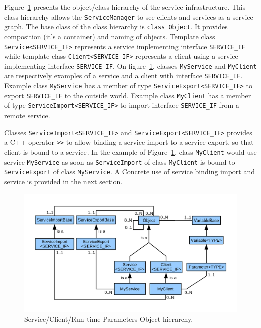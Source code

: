 Figure~\ref{fig:tms320c3x_object_hierarchy} presents the object/class hierarchy of the service infrastructure. This class hierarchy allows the \texttt{ServiceManager} to see clients and services as a service graph. The base class of the class hierarchy is \texttt{class Object}. It provides composition (it's a container) and naming of objects. Template class \texttt{Service<SERVICE\_IF>} represents a service implementing interface \texttt{SERVICE\_IF} while template class \texttt{Client<SERVICE\_IF>} represents a client using a service implementing interface \texttt{SERVICE\_IF}. On figure~\ref{fig:tms320c3x_object_hierarchy}, classes \texttt{MyService} and \texttt{MyClient} are respectively examples of a service and a client with interface \texttt{SERVICE\_IF}. Example class \texttt{MyService} has a member of type \texttt{ServiceExport<SERVICE\_IF>} to export \texttt{SERVICE\_IF} to the outside world. Example class \texttt{MyClient} has a member of type \texttt{ServiceImport<SERVICE\_IF>} to import interface \texttt{SERVICE\_IF} from a remote service.

Classes \texttt{ServiceImport<SERVICE\_IF>} and \texttt{ServiceExport<SERVICE\_IF>} provides a C++ operator \texttt{>>} to allow binding a service import to a service export, so that client is bound to a service. In the example of Figure~\ref{fig:tms320c3x_object_hierarchy}, class \texttt{MyClient} would use service \texttt{MyService} as soon as \texttt{ServiceImport} of class \texttt{MyClient} is bound to \texttt{ServiceExport} of class \texttt{MyService}.
A Concrete use of service binding import and service is provided in the next section.

\begin{figure}[!h]
	\begin{center}
		\includegraphics[width=\textwidth]{tms320c3x/fig_object_hierarchy.pdf}
	\end{center}
	\caption{Service/Client/Run-time Parameters Object hierarchy.}
	\label{fig:tms320c3x_object_hierarchy}
\end{figure}


